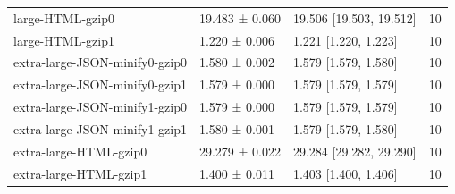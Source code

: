 \begin{tabular}{lllr}
large-HTML-gzip0 & 19.483 ± 0.060 & 19.506 [19.503, 19.512] & 10 \\
large-HTML-gzip1 & 1.220 ± 0.006 & 1.221 [1.220, 1.223] & 10 \\
extra-large-JSON-minify0-gzip0 & 1.580 ± 0.002 & 1.579 [1.579, 1.580] & 10 \\
extra-large-JSON-minify0-gzip1 & 1.579 ± 0.000 & 1.579 [1.579, 1.579] & 10 \\
extra-large-JSON-minify1-gzip0 & 1.579 ± 0.000 & 1.579 [1.579, 1.579] & 10 \\
extra-large-JSON-minify1-gzip1 & 1.580 ± 0.001 & 1.579 [1.579, 1.580] & 10 \\
extra-large-HTML-gzip0 & 29.279 ± 0.022 & 29.284 [29.282, 29.290] & 10 \\
extra-large-HTML-gzip1 & 1.400 ± 0.011 & 1.403 [1.400, 1.406] & 10 \\
\bottomrule
\end{tabular}
